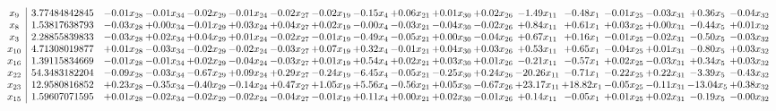 \documentclass[9pt]{article}
\begin{document}
 \[\begin{array}{c| c c@{\hskip 2pt} c@{\hskip 2pt} c@{\hskip 2pt} c@{\hskip 2pt} c@{\hskip 2pt} c@{\hskip 2pt} c@{\hskip 2pt} c@{\hskip 2pt} c@{\hskip 2pt} c@{\hskip 2pt} c@{\hskip 2pt} c@{\hskip 2pt} c@{\hskip 2pt} c@{\hskip 2pt} c@{\hskip 2pt} c@{\hskip 2pt} }
 x_{9}   &  3.77484842845 & -0.01 x_{28} & -0.01 x_{34} & -0.02 x_{29} & -0.01 x_{24} & -0.02 x_{27} & -0.02 x_{19} & -0.15 x_{4} & +  0.06 x_{21} & +  0.01 x_{30} & +  0.02 x_{26} & -1.49 x_{11} & -0.48 x_{1} & -0.01 x_{25} & -0.03 x_{31} & +  0.36 x_{5} & -0.04 x_{32}\\
 x_{8}   &  1.53817638793 & -0.03 x_{28} & +  0.00 x_{34} & -0.01 x_{29} & +  0.03 x_{24} & +  0.04 x_{27} & +  0.02 x_{19} & -0.00 x_{4} & -0.03 x_{21} & -0.04 x_{30} & -0.02 x_{26} & +  0.84 x_{11} & +  0.61 x_{1} & +  0.03 x_{25} & +  0.00 x_{31} & -0.44 x_{5} & +  0.01 x_{32}\\
 x_{3}   &  2.28855839833 & -0.03 x_{28} & +  0.02 x_{34} & +  0.04 x_{29} & +  0.01 x_{24} & -0.02 x_{27} & -0.01 x_{19} & -0.49 x_{4} & -0.05 x_{21} & +  0.00 x_{30} & -0.04 x_{26} & +  0.67 x_{11} & +  0.16 x_{1} & -0.01 x_{25} & -0.02 x_{31} & -0.50 x_{5} & -0.03 x_{32}\\
 x_{10}   &  4.71308019877 & +  0.01 x_{28} & -0.03 x_{34} & -0.02 x_{29} & -0.02 x_{24} & -0.03 x_{27} & +  0.07 x_{19} & +  0.32 x_{4} & -0.01 x_{21} & +  0.04 x_{30} & +  0.03 x_{26} & +  0.53 x_{11} & +  0.65 x_{1} & -0.04 x_{25} & +  0.01 x_{31} & -0.80 x_{5} & +  0.03 x_{32}\\
 x_{16}   &  1.39115834669 & -0.01 x_{28} & -0.01 x_{34} & +  0.02 x_{29} & -0.04 x_{24} & -0.03 x_{27} & +  0.01 x_{19} & +  0.54 x_{4} & +  0.02 x_{21} & +  0.03 x_{30} & +  0.01 x_{26} & -0.21 x_{11} & -0.57 x_{1} & +  0.02 x_{25} & -0.03 x_{31} & +  0.34 x_{5} & +  0.03 x_{32}\\
 x_{22}   &  54.3483182204 & -0.09 x_{28} & -0.03 x_{34} & -0.67 x_{29} & +  0.09 x_{24} & +  0.29 x_{27} & -0.24 x_{19} & -6.45 x_{4} & -0.05 x_{21} & -0.25 x_{30} & +  0.24 x_{26} & -20.26 x_{11} & -0.71 x_{1} & -0.22 x_{25} & +  0.22 x_{31} & -3.39 x_{5} & -0.43 x_{32}\\
 x_{23}   &  12.9580816852 & +  0.23 x_{28} & -0.35 x_{34} & -0.40 x_{29} & -0.14 x_{24} & +  0.47 x_{27} & +  1.05 x_{19} & +  5.56 x_{4} & -0.56 x_{21} & +  0.05 x_{30} & -0.67 x_{26} & + 23.17 x_{11} & + 18.82 x_{1} & -0.05 x_{25} & -0.11 x_{31} & -13.04 x_{5} & +  0.38 x_{32}\\
 x_{15}   &  1.59607071595 & +  0.01 x_{28} & -0.02 x_{34} & -0.02 x_{29} & -0.02 x_{24} & -0.04 x_{27} & -0.01 x_{19} & +  0.11 x_{4} & +  0.00 x_{21} & +  0.02 x_{30} & -0.01 x_{26} & +  0.14 x_{11} & -0.05 x_{1} & +  0.01 x_{25} & +  0.02 x_{31} & -0.19 x_{5} & -0.00 x_{32}\\

\end{array}\]
\end{document}
